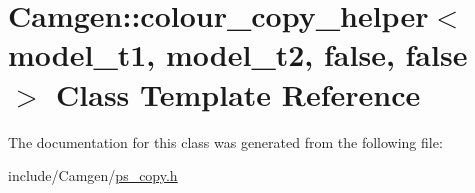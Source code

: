 \hypertarget{a00075}{\section{Camgen\-:\-:colour\-\_\-copy\-\_\-helper$<$ model\-\_\-t1, model\-\_\-t2, false, false $>$ Class Template Reference}
\label{a00075}
}


The documentation for this class was generated from the following file\-:\begin{DoxyCompactItemize}
\item 
include/\-Camgen/\hyperlink{a00712}{ps\-\_\-copy.\-h}\end{DoxyCompactItemize}
